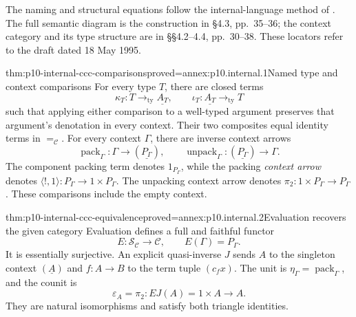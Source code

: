 The naming and structural equations follow the internal-language method
of \cite[\S2.3, pp.~10--11, Proposition~2.3.1]{Pitts1995Draft}.
The full semantic diagram is the construction in \S4.3, pp.~35--36;
the context category and its type structure are in \S\S4.2--4.4,
pp.~30--38.  These locators refer to the draft dated 18 May 1995.

\begin{hbtheorem}{thm:p10-internal-ccc-comparisons}{proved=annex:p10.internal.1}{Named type and context comparisons}
For every type \(T\), there are closed terms
\[
 \kappa_T:T\mathbin{\to_{\mathrm{ty}}}\underline{A_T},
 \qquad
 \iota_T:\underline{A_T}\mathbin{\to_{\mathrm{ty}}}T
\]
such that applying either comparison to a well-typed argument preserves
that argument's denotation in every context.
Their two composites equal identity terms in \(=_{\mathcal C}\).
For every context \(\Gamma\), there are inverse context arrows
\[
 \operatorname{pack}_\Gamma:\Gamma\longrightarrow(\underline{P_\Gamma}),
 \qquad
 \operatorname{unpack}_\Gamma:(\underline{P_\Gamma})\longrightarrow\Gamma.
\]
The component packing term denotes \(1_{P_\Gamma}\), while the packing
\emph{context arrow} denotes
\(\langle!,1\rangle:P_\Gamma\to1\times P_\Gamma\).
The unpacking context arrow denotes
\(\pi_2:1\times P_\Gamma\to P_\Gamma\).
These comparisons include the empty context.
\end{hbtheorem}

\begin{hbtheorem}{thm:p10-internal-ccc-equivalence}{proved=annex:p10.internal.2}{Evaluation recovers the given category}
Evaluation defines a full and faithful functor
\[
 E:\mathcal S_{\mathcal C}\longrightarrow\mathcal C,
 \qquad E(\Gamma)=P_\Gamma.
\]
It is essentially surjective.
An explicit quasi-inverse \(J\) sends \(A\) to the singleton context
\((\underline A)\) and \(f:A\to B\) to the term tuple \((c_fx)\).
The unit is \(\eta_\Gamma=\operatorname{pack}_\Gamma\), and the counit is
\[
 \varepsilon_A=\pi_2:EJ(A)=1\times A\longrightarrow A.
\]
They are natural isomorphisms and satisfy both triangle identities.
\end{hbtheorem}

